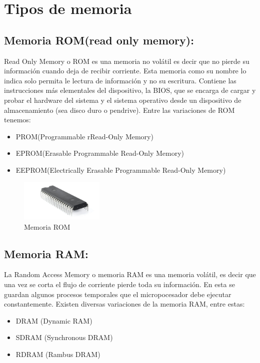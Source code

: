 \documentclass{article}
\begin{document}
\section{Tipos de memoria}

\subsection{Memoria ROM(read only memory):} 
Read Only Memory o ROM es una memoria no volátil es decir que no pierde su información cuando deja de recibir corriente. Esta memoria como su nombre lo indica solo permita le lectura de información y no su escritura. Contiene las instrucciones más elementales del dispositivo, la BIOS, que se encarga de cargar y probar el hardware del sistema y el sistema operativo desde un dispositivo de almacenamiento (sea disco duro o pendrive). Entre las variaciones de ROM tenemos:

\begin{itemize}
    \item{PROM(Programmable rRead-Only Memory)}
    \item{EPROM(Erasable Programmable Read-Only Memory)}
    \item{EEPROM(Electrically Erasable Programmable Read-Only Memory)}
\end{itemize}

\begin{figure}[h]
\includegraphics[width=4cm]{rom.jpg}
\centering
\caption{Memoria ROM}
\end{figure}

\subsection{Memoria RAM:}
La Random Access Memory o memoria RAM es una memoria volátil, es decir que una vez se corta el flujo de corriente pierde toda su información. En esta se guardan algunos procesos temporales que el micropocesador debe ejecutar constantemente. Existen diversas variaciones de la memoria RAM, entre estas:
\begin{itemize}
    \item{DRAM (Dynamic RAM)}
    \item{SDRAM (Synchronous DRAM)}
    \item{RDRAM (Rambus DRAM)}
\end{itemize}
\end{document}
